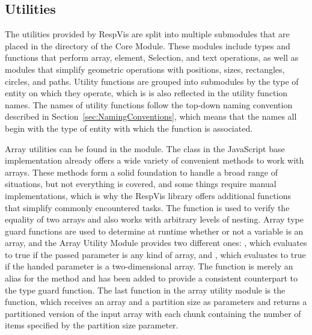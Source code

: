 \subsection{Utilities}

The utilities provided by RespVis are split into multiple submodules that are placed in the  directory of the Core Module.
These modules include types and functions that perform array, element, Selection, and text operations, as well as modules that simplify geometric operations with positions, sizes, rectangles, circles, and paths.
Utility functions are grouped into submodules by the type of entity on which they operate, which is is also reflected in the utility function names.
The names of utility functions follow the top-down naming convention described in Section~\ref{sec:NamingConventions}, which means that the names all begin with the type of entity with which the function is associated.

Array utilities can be found in the  module.
The  class in the JavaScript base implementation already offers a wide variety of convenient methods to work with arrays.
These methods form a solid foundation to handle a broad range of situations, but not everything is covered, and some things require manual implementations, which is why the RespVis library offers additional functions that simplify commonly encountered tasks.
The  function is used to verify the equality of two arrays and also works with arbitrary levels of nesting. 
Array type guard functions are used to determine at runtime whether or not a variable is an array, and the Array Utility Module provides two different ones: , which evaluates to true if the passed parameter is any kind of array, and , which evaluates to true if the handed parameter is a two-dimensional array.
The  function is merely an alias for the  method and has been added to provide a consistent counterpart to the  type guard function.
The last function in the array utility module is the  function, which receives an array and a partition size as parameters and returns a partitioned version of the input array with each chunk containing the number of items specified by the partition size parameter.


